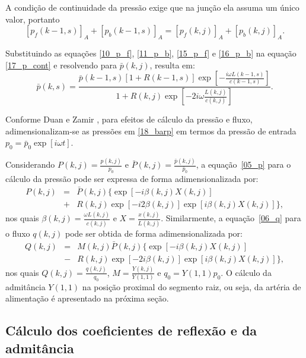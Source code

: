 \documentclass[
        english,			
        brazil			        %
        ,<...>]{abntbibufjf}
\begin{document}
A condição de continuidade da pressão exige que na junção ela assuma um único valor, portanto
\begin{equation}
\left[ p_f(k-1,s) \right]_A + \left[ p_b (k-1,s) \right]_A = \left[ p_f(k,j) \right]_A + \left[ p_b(k,j) \right]_A.
\label{17_p_cont}
\end{equation}

Substituindo as equações \eqref{10_p_f}, \eqref{11_p_b}, \eqref{15_p_f} e \eqref{16_p_b} na equação \eqref{17_p_cont} e resolvendo para $\bar{p}(k,j)$, resulta em:
\begin{equation}
\bar{p} (k,s) =  \frac{\bar{p}(k-1,s)\left[1 + R(k-1,s)\right] \exp\left[ -\frac{i \omega L(k-1,s)}{c(k-1,s)}\right]}{1 + R(k,j)\exp{\left[ -2i\omega \frac{L(k,j)}{c(k,j)}\right]}}.
\label{18_barp}
\end{equation}

Conforme Duan e Zamir \cite{Duan}, para efeitos de cálculo da pressão e fluxo, adimensionalizam-se as pressões em \eqref{18_barp} em termos da pressão de entrada $p_0 = \bar{p}_0 \exp[i\omega t]$. 

Considerando $P(k,j) = \frac{p(k,j)}{p_0}$ e $\bar{P} (k,j) = \frac{\bar{p}(k,j)}{\bar{p}_0}$, a equação~\eqref{05_p} para o cálculo da pressão  pode ser expressa de forma adimensionalizada por:
\begin{eqnarray}
P(k,j) &=& \bar{P}(k,j)\big\{\exp[ -i\beta(k,j) X(k,j)] \nonumber \\
& +& R(k,j) \exp[-i2\beta(k,j)] \exp[i\beta(k,j) X(k,j)]\big\},
\label{21_P}
\end{eqnarray}
nos quais $\beta(k,j) = \frac{\omega L(k,j)}{c(k,j)}$ e $X = \frac{x(k,j)}{L(k,j)}$. Similarmente, a equação~\eqref{06_q} para o fluxo $q(k,j)$ pode ser obtida de forma adimensionalizada por:
\begin{eqnarray}
Q(k,j) &=& M(k,j)\bar{P}(k,j)\big\{ \exp\left[ -i\beta(k,j) X(k,j) \right] \nonumber \\ 
&-& R(k,j) \exp[ -2i\beta(k,j)] \exp[i\beta(k,j) X(k,j)] \big\},
\label{23_Q}
\end{eqnarray}
nos quais $Q(k,j) = \frac{q (k,j)}{q_0}$, $M = \frac{Y(k,j)}{Y(1,1)}$ e $q_0 = Y(1,1)p_0$. O cálculo da admitância $Y(1,1)$ na posição proximal do segmento raiz, ou seja, da artéria de alimentação é apresentado na próxima seção.

\subsection{Cálculo dos coeficientes de reflexão e da admitância}\label{sec:admittance}
\end{document}
